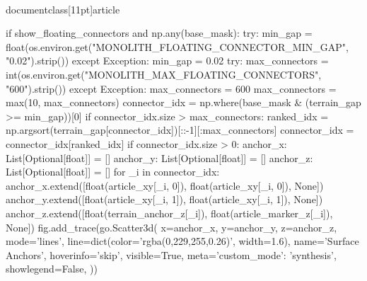 \\documentclass[11pt]{article}
\begin{document}
\begin{CodeBlock}
{{{{{            if show_floating_connectors and np.any(base_mask):
                try:
                    min_gap = float(os.environ.get("MONOLITH_FLOATING_CONNECTOR_MIN_GAP", "0.02").strip())
                except Exception:
                    min_gap = 0.02
                try:
                    max_connectors = int(os.environ.get("MONOLITH_MAX_FLOATING_CONNECTORS", "600").strip())
                except Exception:
                    max_connectors = 600
                max_connectors = max(10, max_connectors)
                connector_idx = np.where(base_mask & (terrain_gap >= min_gap))[0]
                if connector_idx.size > max_connectors:
                    ranked_idx = np.argsort(terrain_gap[connector_idx])[::-1][:max_connectors]
                    connector_idx = connector_idx[ranked_idx]
                if connector_idx.size > 0:
                    anchor_x: List[Optional[float]] = []
                    anchor_y: List[Optional[float]] = []
                    anchor_z: List[Optional[float]] = []
                    for _i in connector_idx:
                        anchor_x.extend([float(article_xy[_i, 0]), float(article_xy[_i, 0]), None])
                        anchor_y.extend([float(article_xy[_i, 1]), float(article_xy[_i, 1]), None])
                        anchor_z.extend([float(terrain_anchor_z[_i]), float(article_marker_z[_i]), None])
                    fig.add_trace(go.Scatter3d(
                        x=anchor_x,
                        y=anchor_y,
                        z=anchor_z,
                        mode='lines',
                        line=dict(color='rgba(0,229,255,0.26)', width=1.6),
                        name='Surface Anchors',
                        hoverinfo='skip',
                        visible=True,
                        meta={'custom_mode': 'synthesis'},
                        showlegend=False,
                    ))

}}}}}
\end{CodeBlock}
\end{document}
